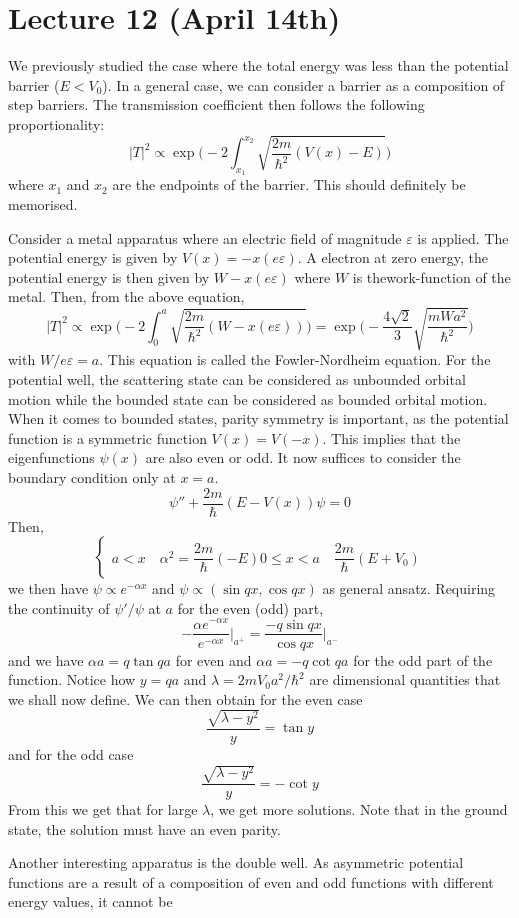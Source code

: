 \section{Lecture 12 (April 14th)}
\begin{rmk}
We previously studied the case where the total energy was less than the potential barrier ($E<V_0$). In a general case, we can consider a barrier as a composition of step barriers. The transmission coefficient then follows the following proportionality:
\[|T|^2\propto \exp \Big(-2\int ^{x_2}_{x_1}\sqrt{\dfrac{2m}{\hbar ^2}(V(x)-E)}\Big)\]
where $x_1$ and $x_2$ are the endpoints of the barrier. This should definitely be memorised.
\end{rmk}
\vspace{2ex}
\begin{ex}
Consider a metal apparatus where an electric field of magnitude $\varepsilon $ is applied. The potential energy is given by $V(x)=-x(e\varepsilon )$. A electron at zero energy, the potential energy is then given by $W-x(e\varepsilon )$ where $W$ is thework-function of the metal. Then, from the above equation,
\[|T|^2\propto \exp \Big(-2\int ^{a}_{0}\sqrt{\dfrac{2m}{\hbar ^2}(W-x(e\varepsilon ))}\Big)=\exp \Big(-\dfrac{4\sqrt{2}}{3}\sqrt{\dfrac{mWa^2}{\hbar ^2}}\Big)\]
with $W/e\varepsilon =a$. This equation is called the Fowler-Nordheim equation. For the potential well, the scattering state can be considered as unbounded orbital motion while the bounded state can be considered as bounded orbital motion. When it comes to bounded states, parity symmetry is important, as the potential function is a symmetric function $V(x)=V(-x)$. This implies that the eigenfunctions $\psi (x)$ are also even or odd. It now suffices to consider the boundary condition only at $x=a$. 
\[\psi ''+\dfrac{2m}{\hbar }(E-V(x))\psi =0\]
Then,
\[\begin{cases}
a<x\quad \alpha ^2=\dfrac{2m}{\hbar }(-E)
0\leq x<a\quad \dfrac{2m}{\hbar }(E+V_0)
\end{cases}\]
we then have $\psi \propto e^{-\alpha x}$ and $\psi \propto (\sin qx,\cos qx)$ as general ansatz. Requiring the continuity of $\psi '/\psi $ at $a$ for the even (odd) part,
\[-\dfrac{\alpha e^{-\alpha x}}{e^{-\alpha x}}\Big|_{a^{+}}=\dfrac{-q\sin qx}{\cos qx}\Big|_{a^{-}}\]
and we have $\alpha a =q\tan qa$ for even and $\alpha a=-q\cot qa$ for the odd part of the function. Notice how $y=qa$ and $\lambda =2mV_0a^2/\hbar ^2$ are dimensional quantities that we shall now define. 
We can then obtain for the even case
\[\dfrac{\sqrt{\lambda -y^2}}{y}=\tan y\]
and for the odd case
\[\dfrac{\sqrt{\lambda -y^2}}{y}=-\cot y\]
From this we get that for large $\lambda $, we get more solutions. Note that in the ground state, the solution must have an even parity. 
\end{ex}  
\vspace{2ex}
\begin{thm}
Another interesting apparatus is the double well. As asymmetric potential functions are a result of a composition of even and odd functions with different energy values, it cannot be 
\end{thm}
\vspace{2ex}

